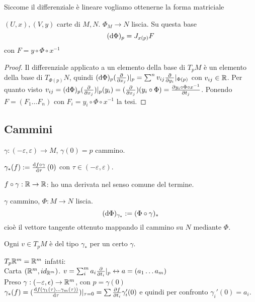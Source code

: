 Siccome il differenziale è lineare vogliamo ottenerne la forma
matriciale
\begin{theorem}
    $(U,x),(V,y)$ carte di $M,N$. $\Phi_M\rightarrow N$ liscia.
    Su questa base
    \begin{displaymath}
        (\dd{\Phi})_{p}=J_{x(p)}F
    \end{displaymath}
    con $F=y\circ\Phi\circ x^{-1}$
\end{theorem}
\begin{proof}
    Il differenziale applicato a un elemento della base di $T_pM$ è
    un elemento della base di $T_{\Phi(p)}N$, quindi
    $(\dd{\Phi})_{p}(\pdv{x_j})|_p=\sum^nv_{ij}\pdv{y_i}|_{\Phi(p)}$
    con $v_{ij}\in\mathbb{R}$.
    Per quanto visto $v_{ij}=(\dd{\Phi})_{p}(\pdv{x_j})|_p(y_i)=
    (\pdv{x_j})(y_i\circ\Phi)=\pdv{y_i\circ\Phi\circ
    x^{-1}}{t_j}(x(p))$. Ponendo $F=(F_1\dots F_n)$ con
    $F_i=y_i\circ\Phi\circ x^{-1}$ la tesi.
\end{proof}


\subsection{Cammini}
$\gamma:(-\varepsilon,\varepsilon)\rightarrow M$, $\gamma(0)=p$
cammino.
\begin{definition}
    $\gamma_*(f):=\dv{f\circ\gamma}{\tau}\,(0)$ con
    $\tau\in(-\varepsilon,\varepsilon)$.
\end{definition}
$f\circ\gamma:\mathbb{R}\to\mathbb{R}$: ho una derivata nel senso comune del
termine.

\begin{definition}[Differenziale]
    $\gamma$ cammino, $\Phi:M\rightarrow N$ liscia.
    \begin{displaymath}
        (\dd{\Phi})_{\gamma_*}:=(\Phi\circ\gamma)_*
    \end{displaymath}
    cioè il vettore tangente ottenuto mappando il cammino su $N$
    mediante $\Phi$.
\end{definition}

Ogni $v\in T_pM$ è del tipo $\gamma_*$ per un certo $\gamma$.
\begin{ex}
    $T_p\mathbb{R}^m=\mathbb{R}^m$ infatti:\\
    Carta $(\mathbb{R}^m,id_{\mathbb{R}^m})$. $v=\sum_i^m
    a_i\pdv{t_i}|_p\leftrightarrow a=(a_1\dots a_m)$ \\
    Preso $\gamma:(-\varepsilon,\epsilon)\rightarrow\mathbb{R}^m$,
    con $p=\gamma(0)$
    $\gamma_*(f)=
    (\dv{f(\gamma_1(\tau)\dots\gamma_m(\tau))}{\tau})|_{\tau=0}=
    \sum \pdv{f}{t_i}(p)\gamma_i'(0)$ e quindi per confronto
    $\gamma_i'(0)=a_i$.
\end{ex}


